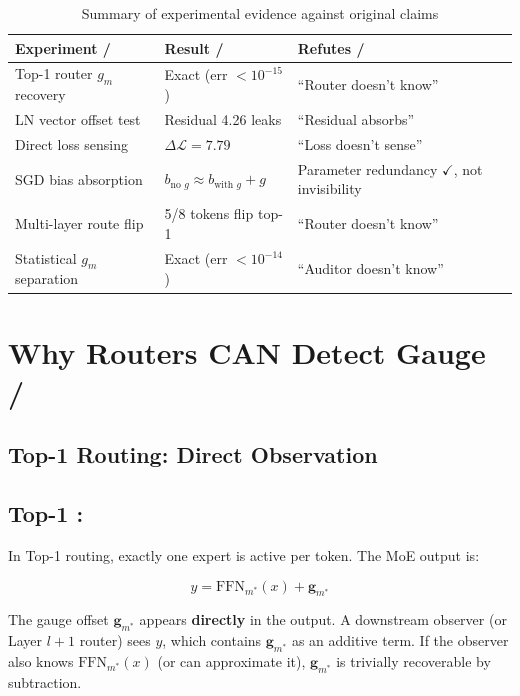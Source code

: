 \documentclass[11pt,a4paper]{article}
\newcommand{\gauge}{\mathbf{g}}
\begin{document}
\begin{table}[h]
\centering
\caption{Summary of experimental evidence against original claims}
\begin{tabular}{@{}lll@{}}
\toprule
\textbf{Experiment / } & \textbf{Result / } & \textbf{Refutes / } \\
\midrule
Top-1 router $g_m$ recovery    & Exact (err $<10^{-15}$) & ``Router doesn't know'' \\
LN vector offset test          & Residual 4.26 leaks     & ``Residual absorbs'' \\
Direct loss sensing            & $\Delta\mathcal{L}=7.79$ & ``Loss doesn't sense'' \\
SGD bias absorption            & $b_{\text{no }g} \approx b_{\text{with }g}+g$ & Parameter redundancy $\checkmark$, not invisibility \\
Multi-layer route flip         & 5/8 tokens flip top-1   & ``Router doesn't know'' \\
Statistical $g_m$ separation   & Exact (err $<10^{-14}$) & ``Auditor doesn't know'' \\
\bottomrule
\end{tabular}
\end{table}

\section{Why Routers CAN Detect Gauge / }

\subsection{Top-1 Routing: Direct Observation}
\subsection{Top-1 : }

In Top-1 routing, exactly one expert is active per token. The MoE output is:

\begin{equation}
    y = \text{FFN}_{m^*}(x) + \gauge_{m^*}
\end{equation}

The gauge offset $\gauge_{m^*}$ appears \textbf{directly} in the output.
A downstream observer (or Layer $l+1$ router) sees $y$, which contains
$\gauge_{m^*}$ as an additive term. If the observer also knows $\text{FFN}_{m^*}(x)$
(or can approximate it), $\gauge_{m^*}$ is trivially recoverable by subtraction.
\end{document}
